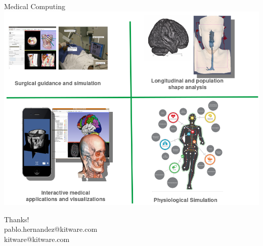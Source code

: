 \documentclass[10pt,aspectratio=169]{beamer}
\begin{document}
{
\begin{frame}{Medical Computing}
    \centering
    \includegraphics[height=0.9\textheight]{./logos/kitware_medical.png}
\end{frame}
}

\begin{frame}[standout]
  \centering
  {\huge Thanks!}\\
  pablo.hernandez@kitware.com\\
  kitware@kitware.com
  \vspace{1cm}
\end{frame}

\appendix
\end{document}

